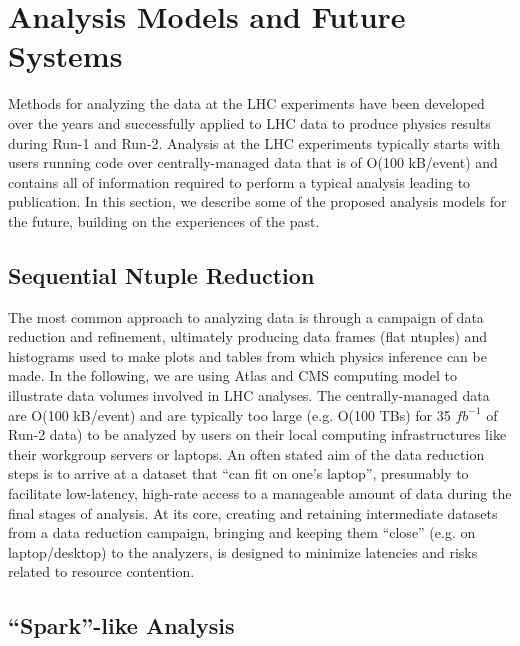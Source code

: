\documentclass[12pt,a4paper]{article}
\begin{document}
\section{Analysis Models and Future Systems}\label{sec:models}

Methods for analyzing the data at the LHC experiments have been developed over the years and successfully applied to LHC data to produce physics results during Run-1 and Run-2. Analysis at the LHC experiments typically starts with users running code over centrally-managed data that is of O(100 kB/event) and contains all of information required to perform a typical analysis leading to publication. In this section, we describe some of the proposed analysis models for the future, building on the experiences of the past.

\subsection{Sequential Ntuple Reduction}

The most common approach to analyzing data is through a campaign of data reduction and refinement, ultimately producing data frames (flat ntuples) and histograms used to make plots and tables from which physics inference can be made. In the following, we are using Atlas and CMS computing model to illustrate data volumes involved in LHC analyses. The centrally-managed data are O(100 kB/event) and are typically too large (e.g. O(100 TBs) for 35 $fb^{-1}$ of Run-2 data) to be analyzed by users on their local computing infrastructures like their workgroup servers or laptops. An often stated aim of the data reduction steps is to arrive at a dataset that ``can fit on one's laptop'', presumably to facilitate low-latency, high-rate access to a manageable amount of data during the final stages of analysis.  At its core, creating and retaining intermediate datasets from a data reduction campaign, bringing and keeping them ``close'' (e.g. on laptop/desktop) to the analyzers, is designed to minimize latencies and risks related to resource contention.

\subsection{``Spark''-like Analysis}
\end{document}
